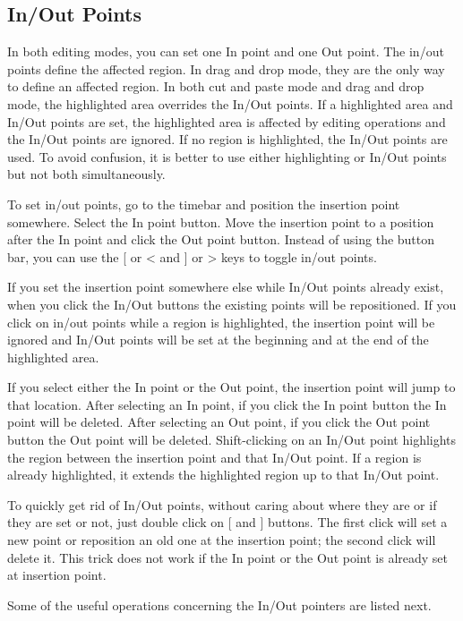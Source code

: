 \subsection{In/Out Points}%
\label{sub:in_out_points}

In both editing modes, you can set one In point and one Out point. 
The in/out points define the affected region. 
In drag and drop mode, they are the only way to define an affected region. 
In both cut and paste mode and drag and drop mode, the highlighted area overrides the In/Out points. 
If a highlighted area and In/Out points are set, the highlighted area is affected by editing operations and the In/Out points are ignored. 
If no region is highlighted, the In/Out points are used. 
To avoid confusion, it is better to use either highlighting or In/Out points but not both simultaneously.

To set in/out points, go to the timebar and position the insertion point somewhere. 
Select the In point button. 
Move the insertion point to a position after the In point and click the Out point button. 
Instead of using the button bar, you can use the [ or < and ] or > keys to toggle in/out points.

If you set the insertion point somewhere else while In/Out points already exist, when you click the In/Out buttons the existing points will be repositioned. 
If you click on in/out points while a region is highlighted, the insertion point will be ignored and In/Out points will be set at the beginning and at the end of the highlighted area.

If you select either the In point or the Out point, the insertion point will jump to that location. 
After selecting an In point, if you click the In point button the In point will be deleted. 
After selecting an Out point, if you click the Out point button the Out point will be deleted. 
Shift-clicking on an In/Out point highlights the region between the insertion point and that In/Out point. 
If a region is already highlighted, it extends the highlighted region up to that In/Out point.

To quickly get rid of In/Out points, without caring about where they are or if they are set or not, just double click on [ and ] buttons. 
The first click will set a new point or reposition an old one at the insertion point; the second click will delete it. This trick does not work if the In point or the Out point is already set at insertion point.

Some of the useful operations concerning the In/Out pointers are listed next.

